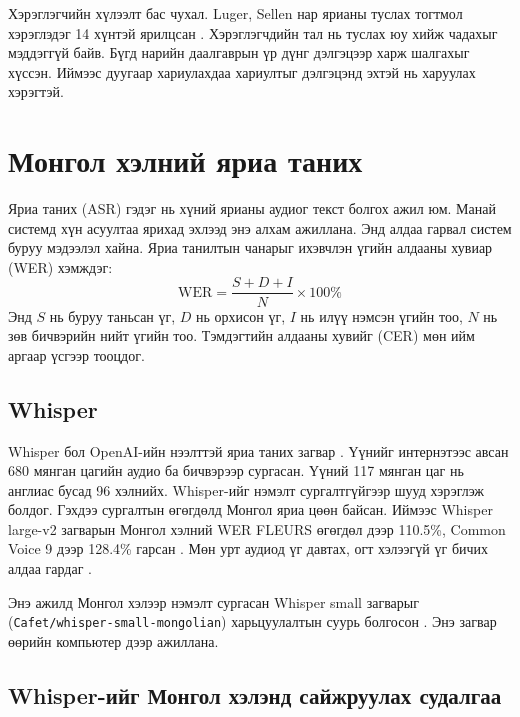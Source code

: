 Хэрэглэгчийн хүлээлт бас чухал. Luger, Sellen нар ярианы туслах тогтмол хэрэглэдэг 14 хүнтэй ярилцсан \cite{luger2016badpa}. Хэрэглэгчдийн тал нь туслах юу хийж чадахыг мэддэггүй байв. Бүгд нарийн даалгаврын үр дүнг дэлгэцээр харж шалгахыг хүссэн. Иймээс дуугаар хариулахдаа хариултыг дэлгэцэнд эхтэй нь харуулах хэрэгтэй.

\section{Монгол хэлний яриа таних}
\label{sec:lit-asr}

Яриа таних (\ac{ASR}) гэдэг нь хүний ярианы аудиог текст болгох ажил юм. Манай системд хүн асуултаа ярихад эхлээд энэ алхам ажиллана. Энд алдаа гарвал систем буруу мэдээлэл хайна. Яриа танилтын чанарыг ихэвчлэн үгийн алдааны хувиар (\ac{WER}) хэмждэг:
\begin{equation}
\mathrm{WER} = \frac{S + D + I}{N} \times 100\%
\label{eq:wer}
\end{equation}
Энд $S$ нь буруу таньсан үг, $D$ нь орхисон үг, $I$ нь илүү нэмсэн үгийн тоо, $N$ нь зөв бичвэрийн нийт үгийн тоо. Тэмдэгтийн алдааны хувийг (\ac{CER}) мөн ийм аргаар үсгээр тооцдог.

\subsection{Whisper}

Whisper бол OpenAI-ийн нээлттэй яриа таних загвар \cite{radford2023whisper}. Үүнийг интернэтээс авсан 680 мянган цагийн аудио ба бичвэрээр сургасан. Үүний 117 мянган цаг нь англиас бусад 96 хэлнийх. Whisper-ийг нэмэлт сургалтгүйгээр шууд хэрэглэж болдог. Гэхдээ сургалтын өгөгдөлд Монгол яриа цөөн байсан. Иймээс Whisper large-v2 загварын Монгол хэлний WER FLEURS өгөгдөл дээр 110.5\%, Common Voice 9 дээр 128.4\% гарсан \cite{radford2023whisper}. %
Мөн урт аудиод үг давтах, огт хэлээгүй үг бичих алдаа гардаг \cite{radford2023whisper}.

Энэ ажилд Монгол хэлээр нэмэлт сургасан Whisper small загварыг (\texttt{Cafet/\allowbreak whisper-small-\allowbreak mongolian}) харьцуулалтын суурь болгосон \cite{cafet_whisper_small_mn}. Энэ загвар өөрийн компьютер дээр ажиллана.

\subsection{Whisper-ийг Монгол хэлэнд сайжруулах судалгаа}

